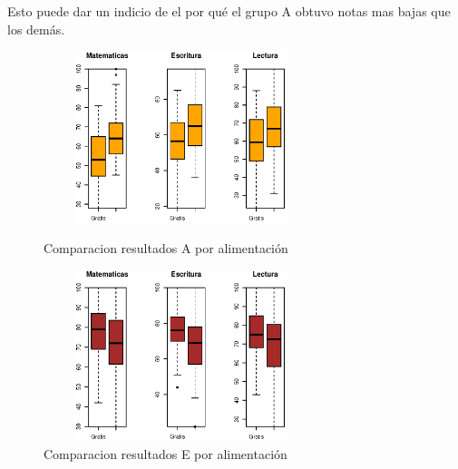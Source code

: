 \documentclass{article}
\begin{document}
    Esto puede dar un indicio de el por qu\'e el grupo A obtuvo notas mas bajas que los dem\'as.


\begin{figure}[H]
        \begin{minipage}[b]{0.45\linewidth}
            \includegraphics[width=8cm,height = 5cm]{Output/Plots/figura11.eps}
            \vspace*{-8.5mm}
            \caption{Comparacion resultados A por alimentaci\'on}
            \label{fig:minipage1}
        \end{minipage}
        \hspace{0.2cm}
        \begin{minipage}[b]{0.45\linewidth}
            \includegraphics[width=8cm,height = 5cm]{Output/Plots/figura12.eps}
            \vspace*{-9mm}
            \caption{Comparacion resultados E por alimentaci\'on}
            \label{fig:minipage2}
        \end{minipage}
    \end{figure}
\end{document}
